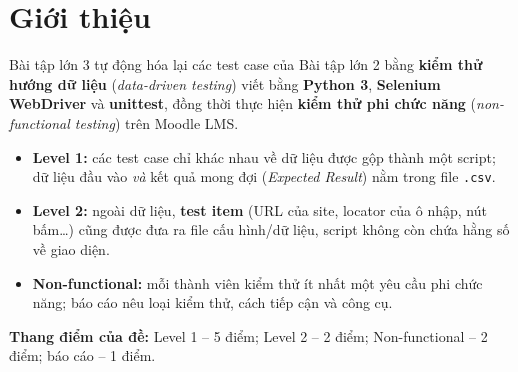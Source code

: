 \documentclass[12pt,a4paper]{article}
\begin{document}
\tableofcontents
\newpage

\section{Giới thiệu}
Bài tập lớn 3 tự động hóa lại các test case của Bài tập lớn 2 bằng \textbf{kiểm thử hướng dữ liệu}
(\textit{data-driven testing}) viết bằng \textbf{Python 3}, \textbf{Selenium WebDriver} và \textbf{unittest},
đồng thời thực hiện \textbf{kiểm thử phi chức năng} (\textit{non-functional testing}) trên Moodle LMS.

\begin{itemize}[noitemsep]
  \item \textbf{Level 1:} các test case chỉ khác nhau về dữ liệu được gộp thành một script; dữ liệu đầu vào \emph{và}
        kết quả mong đợi (\textit{Expected Result}) nằm trong file \texttt{.csv}.
  \item \textbf{Level 2:} ngoài dữ liệu, \textbf{test item} (URL của site, locator của ô nhập, nút bấm\ldots) cũng được đưa ra
        file cấu hình/dữ liệu, script không còn chứa hằng số về giao diện.
  \item \textbf{Non-functional:} mỗi thành viên kiểm thử ít nhất một yêu cầu phi chức năng; báo cáo nêu loại kiểm thử, cách tiếp cận và công cụ.
\end{itemize}

\textbf{Thang điểm của đề:} Level 1 -- 5 điểm; Level 2 -- 2 điểm; Non-functional -- 2 điểm; báo cáo -- 1 điểm.
\end{document}

